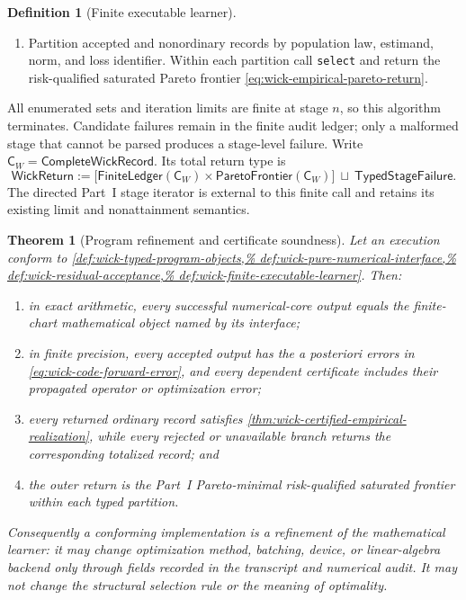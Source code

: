 \documentclass[11pt]{article}
\numberwithin{section}{part}
\theoremstyle{plain}
\newtheorem{theorem}{Theorem}[section]
\theoremstyle{definition}
\newtheorem{definition}[definition]{Definition}
\theoremstyle{remark}
\begin{document}
\begin{definition}[Finite executable learner]
\begin{enumerate}[label=\textup{(E\arabic*)}]
      Part~I bound on the common confidence event.
\item Partition accepted and nonordinary records by population law, estimand,
      norm, and loss identifier.  Within each partition call \texttt{select}
      and return the risk-qualified saturated Pareto frontier
      \eqref{eq:wick-empirical-pareto-return}.
\end{enumerate}
All enumerated sets and iteration limits are finite at stage \(n\), so this
algorithm terminates.  Candidate failures remain in the finite audit ledger;
only a malformed stage that cannot be parsed produces a stage-level failure.
Write \(\mathsf C_W=\mathsf{CompleteWickRecord}\).  Its total return type is
\begin{equation}
 \mathsf{WickReturn}
 :=\bigl[
      \mathsf{FiniteLedger}(\mathsf C_W)
      \times\mathsf{ParetoFrontier}(\mathsf C_W)
    \bigr]
   \ \sqcup\ \mathsf{TypedStageFailure}.
 \label{eq:wick-code-total-return-type}
\end{equation}
The directed Part~I stage iterator is external to this finite call and retains
its existing limit and nonattainment semantics.
\end{definition}

\begin{theorem}[Program refinement and certificate soundness]
\label{thm:wick-program-refinement}
Let an execution conform to
\cref{def:wick-typed-program-objects,%
def:wick-pure-numerical-interface,%
def:wick-residual-acceptance,%
def:wick-finite-executable-learner}.  Then:
\begin{enumerate}[label=\textup{(\roman*)}]
\item in exact arithmetic, every successful numerical-core output equals the
      finite-chart mathematical object named by its interface;
\item in finite precision, every accepted output has the a posteriori errors
      in \eqref{eq:wick-code-forward-error}, and every dependent certificate
      includes their propagated operator or optimization error;
\item every returned ordinary record satisfies
      \cref{thm:wick-certified-empirical-realization}, while every rejected or
      unavailable branch returns the corresponding totalized record; and
\item the outer return is the Part~I Pareto-minimal risk-qualified saturated
      frontier within each typed partition.
\end{enumerate}
Consequently a conforming implementation is a refinement of the mathematical
learner: it may change optimization method, batching, device, or linear-algebra
backend only through fields recorded in the transcript and numerical audit.
It may not change the structural selection rule or the meaning of optimality.
\end{theorem}
\end{document}
